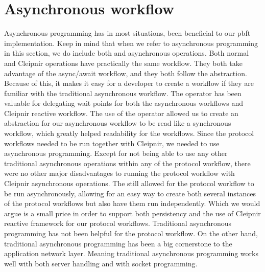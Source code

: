 \section{Asynchronous workflow}
\iffalse
-await operator reactive programming framework Cleipnir provided
-beneficial for our server implementation
-allowed us to easily create task that ran seperate from the main protocol workflow
-Easy to create and handle multiple instances of our protocol implementation, remember to not alter the state inside the function!
-not to difficult to use in combination with traditional synchronous design, due to async await design
-issues in regards to using traditional async with Cleipnir, caused race conditions
-Overusage can slow down the system unnecessarily
\fi
Asynchronous programming has in most situations, been beneficial to our \ac{pbft} implementation. Keep in mind that when we refer to asynchronous programming in this section, we do include both  and  asynchronous operations. Both normal  and Cleipnir  operations have practically the same workflow. They both take advantage of the async/await workflow, and they both follow the  abstraction. Because of this, it makes it easy for a developer to create a  workflow if they are familiar with the traditional asynchronous workflow. The  operator has been valuable for delegating wait points for both the asynchronous workflows and Cleipnir reactive workflow. The use of the  operator allowed us to create an abstraction for our asynchronous workflow to be read like a synchronous workflow, which greatly helped readability for the workflows. 
Since the protocol workflows needed to be run together with Cleipnir, we needed to use  asynchronous programming. Except for not being able to use any other traditional asynchronous operations within any of the protocol workflow, there were no other major disadvantages to running the protocol workflow with Cleipnir asynchronous operations. The  still allowed for the protocol workflow to be run asynchronously, allowing for an easy way to create both several instances of the protocol workflows but also have them run independently. Which we would argue is a small price in order to support both persistency and the use of Cleipnir reactive framework for our protocol workflows.
Traditional asynchronous programming has not been helpful for the protocol workflow. On the other hand, traditional asynchronous programming has been a big cornerstone to the application network layer. Meaning traditional asynchronous programming works well with both server handling and with socket programming.  

